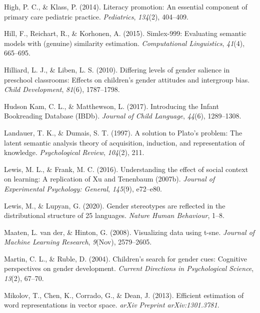 \documentclass[
  english,
  ,man,floatsintext]{apa6}
\begin{document}
\leavevmode\hypertarget{ref-high2014literacy}{}%
High, P. C., \& Klass, P. (2014). Literacy promotion: An essential component of primary care pediatric practice. \emph{Pediatrics}, \emph{134}(2), 404--409.

\leavevmode\hypertarget{ref-hill2015simlex}{}%
Hill, F., Reichart, R., \& Korhonen, A. (2015). Simlex-999: Evaluating semantic models with (genuine) similarity estimation. \emph{Computational Linguistics}, \emph{41}(4), 665--695.

\leavevmode\hypertarget{ref-hilliard2010differing}{}%
Hilliard, L. J., \& Liben, L. S. (2010). Differing levels of gender salience in preschool classrooms: Effects on children's gender attitudes and intergroup bias. \emph{Child Development}, \emph{81}(6), 1787--1798.

\leavevmode\hypertarget{ref-kam_2017}{}%
Hudson Kam, C. L., \& Matthewson, L. (2017). Introducing the Infant Bookreading Database (IBDb). \emph{Journal of Child Language}, \emph{44}(6), 1289--1308.

\leavevmode\hypertarget{ref-landauer1997solution}{}%
Landauer, T. K., \& Dumais, S. T. (1997). A solution to Plato's problem: The latent semantic analysis theory of acquisition, induction, and representation of knowledge. \emph{Psychological Review}, \emph{104}(2), 211.

\leavevmode\hypertarget{ref-lewis2016understanding}{}%
Lewis, M. L., \& Frank, M. C. (2016). Understanding the effect of social context on learning: A replication of Xu and Tenenbaum (2007b). \emph{Journal of Experimental Psychology: General}, \emph{145}(9), e72--e80.

\leavevmode\hypertarget{ref-lewis2020}{}%
Lewis, M., \& Lupyan, G. (2020). Gender stereotypes are reflected in the distributional structure of 25 languages. \emph{Nature Human Behaviour}, 1--8.

\leavevmode\hypertarget{ref-maaten2008visualizing}{}%
Maaten, L. van der, \& Hinton, G. (2008). Visualizing data using t-sne. \emph{Journal of Machine Learning Research}, \emph{9}(Nov), 2579--2605.

\leavevmode\hypertarget{ref-martin2004children}{}%
Martin, C. L., \& Ruble, D. (2004). Children's search for gender cues: Cognitive perspectives on gender development. \emph{Current Directions in Psychological Science}, \emph{13}(2), 67--70.

\leavevmode\hypertarget{ref-mikolov2013efficient}{}%
Mikolov, T., Chen, K., Corrado, G., \& Dean, J. (2013). Efficient estimation of word representations in vector space. \emph{arXiv Preprint arXiv:1301.3781}.
\end{document}
